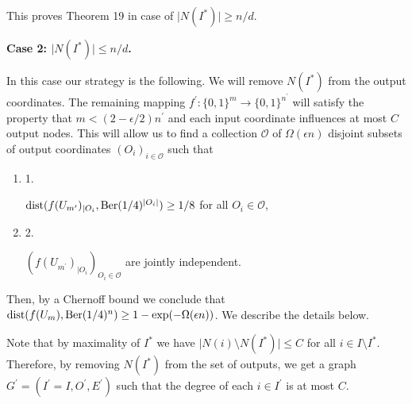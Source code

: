 \documentclass[10pt,a4paper]{article}
\begin{document}
This proves Theorem 19 in case of $\lvert N(I^{*})\rvert\geq n/d$.\par





\par\medskip\noindent\textbf{Case 2: $\lvert N(I^{*})\rvert\leq n/d$.}\par




In this case our strategy is the following. We will remove $N(I^{*})$ from the output coordinates. The remaining mapping $f^{\prime}\colon\{0,1\}^{m}\to\{0,1\}^{n^{\prime}}$ will satisfy the property that $m<(2-\epsilon/2)n^{\prime}$ and each input coordinate influences at most $C$ output nodes. This will allow us to find a collection $\mathcal{O}$ of $\Omega(\epsilon n)$ disjoint subsets of output coordinates $(O_{i})_{i\in\mathcal{O}}$ such that\par


\begin{enumerate}


\item[] 
1. 


$\mathrm{dist}(f(U_{m^{\prime}})_{|O_{i}},\textnormal{Ber}(1/4)^{\lvert O_{i}\rvert})\geq 1/8$ for all $O_{i}\in\mathcal{O}$,\par





\item[] 
2. 


$\left(f(U_{m^{\prime}})_{|O_{i}}\right)_{O_{i}\in\mathcal{O}}$ are jointly independent.\par





\end{enumerate}


Then, by a Chernoff bound we conclude that $\mathrm{dist}(f(U_{m}),\textnormal{Ber}(1/4)^{n})\geq 1-\exp(-\Omega(\epsilon n))$. We describe the details below.\par




Note that by maximality of $I^{*}$ we have $\lvert N(i)\setminus N(I^{*})\rvert\leq C$ for all $i\in I\setminus I^{*}$.
Therefore, by removing $N(I^{*})$ from the set of outputs, we get a graph $G^{\prime}=(I^{\prime}=I,O^{\prime},E^{\prime})$ such that the degree of each $i\in I^{\prime}$ is at most $C$.\par
\end{document}

